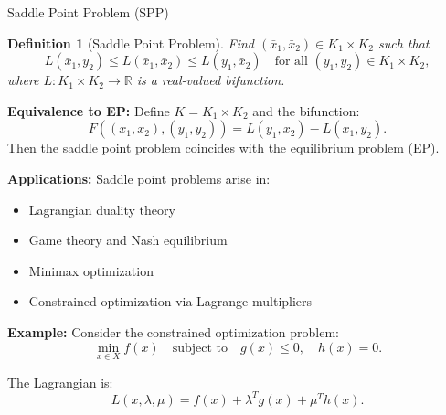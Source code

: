 \documentclass[aspectratio=169,10pt]{beamer}
\newtheorem{definition}{Definition}
\begin{document}
\begin{frame}[allowframebreaks]{Saddle Point Problem (SPP)}
  \begin{definition}[Saddle Point Problem]
    Find $(\bar{x}_1, \bar{x}_2) \in K_1 \times K_2$ such that
    \[
    L(\bar{x}_1, y_2) \leq L(\bar{x}_1, \bar{x}_2) \leq L(y_1, \bar{x}_2) \quad \text{for all } (y_1, y_2) \in K_1 \times K_2,
    \]
    where $L: K_1 \times K_2 \to \mathbb{R}$ is a real-valued bifunction.
  \end{definition}

  \vspace{0.5cm}

  \textbf{Equivalence to EP:} Define $K = K_1 \times K_2$ and the bifunction:
  \[
  F((x_1, x_2), (y_1, y_2)) = L(y_1, x_2) - L(x_1, y_2).
  \]
  Then the saddle point problem coincides with the equilibrium problem (EP).

  \framebreak

  \textbf{Applications:} Saddle point problems arise in:
  \begin{itemize}
    \item Lagrangian duality theory
    \item Game theory and Nash equilibrium
    \item Minimax optimization
    \item Constrained optimization via Lagrange multipliers
  \end{itemize}

  \vspace{0.5cm}

  \textbf{Example:} Consider the constrained optimization problem:
  \[
  \min_{x \in X} f(x) \quad \text{subject to} \quad g(x) \leq 0, \quad h(x) = 0.
  \]

  The Lagrangian is:
  \[
  L(x, \lambda, \mu) = f(x) + \lambda^T g(x) + \mu^T h(x).
  \]
\end{frame}
\end{document}
